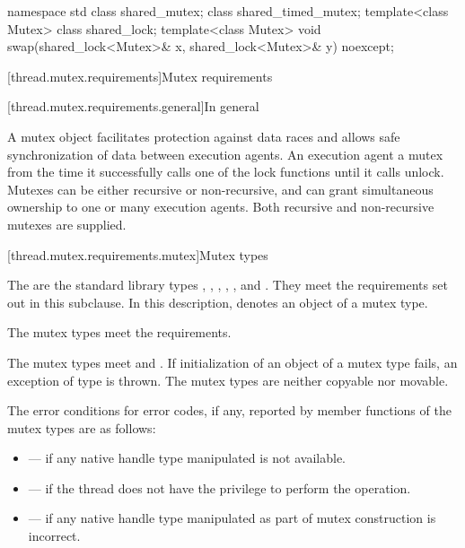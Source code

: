 %
\begin{codeblock}
namespace std {
  class shared_mutex;
  class shared_timed_mutex;
  template<class Mutex> class shared_lock;
  template<class Mutex>
    void swap(shared_lock<Mutex>& x, shared_lock<Mutex>& y) noexcept;
}
\end{codeblock}

[thread.mutex.requirements]{Mutex requirements}

[thread.mutex.requirements.general]{In general}

\pnum
A mutex object facilitates protection against data races and allows safe synchronization of
data between execution agents.
An execution agent  a mutex from the time it successfully calls one of the
lock functions until it calls unlock. Mutexes can be either recursive or non-recursive, and can
grant simultaneous ownership to one or many execution agents. Both
recursive and non-recursive mutexes are supplied.

[thread.mutex.requirements.mutex]{Mutex types}

\pnum
The  are the standard library types ,
, , ,
, and .
They meet the requirements set out in this subclause. In this description, 
denotes an object of a mutex type.

\pnum
The mutex types meet the  requirements.

\pnum
The mutex types meet  and .
If initialization of an object of a mutex type fails,
an exception of type  is thrown.
The mutex types are neither copyable nor movable.

\pnum
The error conditions for error codes, if any, reported by member functions of the mutex types
are as follows:
\begin{itemize}
\item {} --- if any native handle type manipulated is not available.
\item {} --- if the thread does not have the
privilege to perform the operation.
\item {} --- if any native handle type manipulated as part of mutex
construction is incorrect.
\end{itemize}

